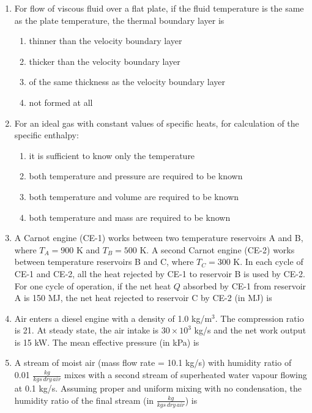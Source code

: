 \documentclass[journal,9pt,onecolumn]{IEEEtran}
\begin{document}
\begin{enumerate}
\item For flow of viscous fluid over a flat plate, if the fluid temperature is the same as the plate temperature, the thermal boundary layer is

\begin{enumerate}
    \item thinner than the velocity boundary layer
    \item thicker than the velocity boundary layer
    \item of the same thickness as the velocity boundary layer
    \item not formed at all
\end{enumerate}


\item For an ideal gas with constant values of specific heats, for calculation of the specific enthalpy:

\begin{enumerate}
    \item it is sufficient to know only the temperature
    \item both temperature and pressure are required to be known
    \item both temperature and volume are required to be known
    \item both temperature and mass are required to be known
\end{enumerate}

\item A Carnot engine (CE-1) works between two temperature reservoirs A and B, where $T_A = 900$ K and $T_B = 500$ K. A second Carnot engine (CE-2) works between temperature reservoirs B and C, where $T_C = 300$ K. In each cycle of CE-1 and CE-2, all the heat rejected by CE-1 to reservoir B is used by CE-2. For one cycle of operation, if the net heat $Q$ absorbed by CE-1 from reservoir A is 150 MJ, the net heat rejected to reservoir C by CE-2 (in MJ) is


    
\item Air enters a diesel engine with a density of 1.0 kg/m$^3$. The compression ratio is 21. At steady state, the air intake is $30 \times 10^3$ kg/s and the net work output is 15 kW. The mean effective pressure (in kPa) is


\item A stream of moist air (mass flow rate = 10.1 kg/s) with humidity ratio of 0.01 $\frac{kg}{kgs\,dry\,air}$ mixes with a second stream of superheated water vapour flowing at 0.1 kg/s. Assuming proper and uniform mixing with no condensation, the humidity ratio of the final stream (in $\frac{kg}{kgs\,dry\,air}$) is



\end{enumerate}
\end{document}
